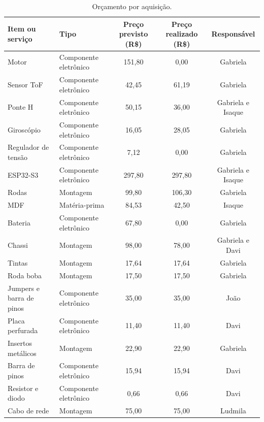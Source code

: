 \begin{landscape}
\begin{table}[htpb]
\centering
\caption{Orçamento por aquisição.}
\begin{tabular}{|l|l|c|c|c|}
\hline
\textbf{Item ou serviço} & \textbf{Tipo} & \textbf{Preço previsto (R\$)} & \textbf{Preço realizado (R\$)} & \textbf{Responsável} \\ \hline
Motor                    & Componente eletrônico & 151,80 & 0,00   & Gabriela \\ \hline
Sensor ToF               & Componente eletrônico & 42,45  & 61,19  & Gabriela \\ \hline
Ponte H                  & Componente eletrônico & 50,15  & 36,00   & Gabriela e Isaque \\ \hline
Giroscópio               & Componente eletrônico & 16,05  & 28,05  & Gabriela \\ \hline
Regulador de tensão      & Componente eletrônico & 7,12   & 0,00   & Gabriela \\ \hline
ESP32-S3                 & Componente eletrônico & 297,80 & 297,80 & Gabriela e Isaque \\ \hline
Rodas                    & Montagem              & 99,80  & 106,30  & Gabriela \\ \hline
MDF                      & Matéria-prima         & 84,53  & 42,50  & Isaque   \\ \hline
Bateria                  & Componente eletrônico & 67,80  & 0,00   & Gabriela \\ \hline
Chassi                   & Montagem              & 98,00  & 78,00  & Gabriela e Davi \\ \hline
Tintas                   & Montagem              & 17,64  & 17,64  & Gabriela \\ \hline
Roda boba                & Montagem              & 17,50  & 17,50  & Gabriela \\ \hline
Jumpers e barra de pinos & Componente eletrônico & 35,00  & 35,00  & João \\ \hline
Placa perfurada & Componente eletrônico & 11,40  & 11,40  & Davi \\ \hline
Insertos metálicos & Montagem & 22,90  & 22,90  & Gabriela \\ \hline
Barra de pinos & Componente eletrônico & 15,94  & 15,94  & Davi \\ \hline
Resistor e diodo & Componente eletrônico & 0,66  & 0,66  & Davi \\ \hline
Cabo de rede & Montagem & 75,00  & 75,00  & Ludmila \\ \hline
\end{tabular}
\end{table}


\end{landscape}
